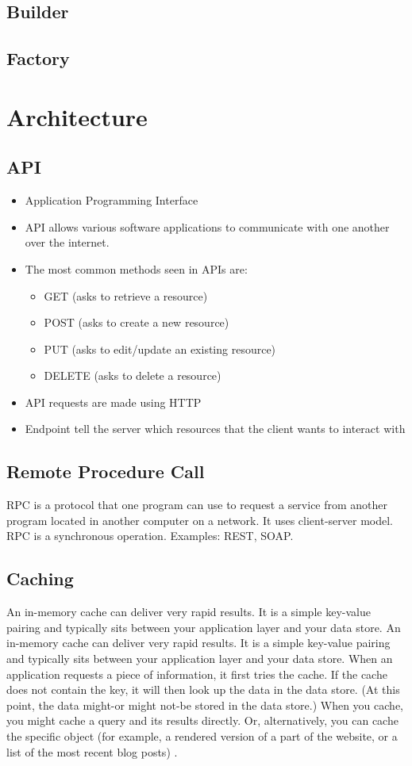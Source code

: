 \documentclass[a4paper, 11.25pt]{article}
\begin{document}
\subsection{Builder}
\subsection{Factory}

\clearpage
\section{Architecture}
\subsection{API}
\begin{itemize}
    \item Application Programming Interface
    \item API allows various software applications to communicate with one another over the internet.
    \item The most common methods seen in APIs are:
    \begin{itemize}
        \item GET (asks to retrieve a resource)
        \item POST (asks to create a new resource)
        \item PUT (asks to edit/update an existing resource)
        \item DELETE (asks to delete a resource)
    \end{itemize}
    \item API requests are made using HTTP
    \item Endpoint tell the server which resources that the client wants to interact with
\end{itemize}
\subsection{Remote Procedure Call}
RPC is a protocol that one program can use to request a service from another program located in another computer on a network. It uses client-server model. RPC is a synchronous operation. Examples: REST, SOAP.
\subsection{Caching}
An in-memory cache can deliver very rapid results. It is a simple key-value pairing and typically sits between your application layer and your data store. An in-memory cache can deliver very rapid results. It is a simple key-value pairing and typically sits between your application layer and your data store. When an application requests a piece of information, it first tries the cache. If the cache does not contain the key, it will then look up the data in the data store. (At this point, the data might-or might not-be stored in the data store.) When you cache, you might cache a query and its results directly. Or, alternatively, you can cache the specific object (for example, a rendered version of a part of the website, or a list of the most recent blog posts) \cite{Cracking2015}.
\end{document}
